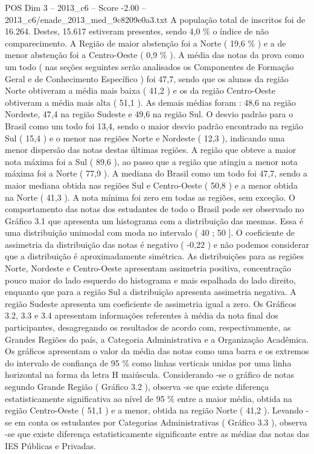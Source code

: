 \begin{textsample}{POS Dim 3 – 2013\_c6 – Score -2.00 – 2013\_c6/enade\_2013\_med\_9c8209e0a3.txt}
A população total de inscritos foi de 16.264.
Destes, 15.617 estiveram presentes, sendo 4,0 \% o índice de não comparecimento.
A Região de maior abstenção foi a Norte ( 19,6 \% ) e a de menor abstenção foi a Centro-Oeste ( 0,9 \% ).
A média das notas da prova como um todo ( nas seções seguintes serão analisados os Componentes de Formação Geral e de Conhecimento Específico ) foi 47,7, sendo que os alunos da região Norte obtiveram a média mais baixa ( 41,2 ) e os da região Centro-Oeste obtiveram a média mais alta ( 51,1 ).
As demais médias foram : 48,6 na região Nordeste, 47,4 na região Sudeste e 49,6 na região Sul.
O desvio padrão para o Brasil como um todo foi 13,4, sendo o maior desvio padrão encontrado na região Sul ( 15,4 ) e o menor nas regiões Norte e Nordeste ( 12,3 ), indicando uma menor dispersão das notas destas últimas regiões.
A região que obteve a maior nota máxima foi a Sul ( 89,6 ), ao passo que a região que atingiu a menor nota máxima foi a Norte ( 77,9 ).
A mediana do Brasil como um todo foi 47,7, sendo a maior mediana obtida nas regiões Sul e Centro-Oeste ( 50,8 ) e a menor obtida na Norte ( 41,3 ).
A nota mínima foi zero em todas as regiões, sem exceção.
O comportamento das notas dos estudantes de todo o Brasil pode ser observado no Gráfico 3.1 que apresenta um histograma com a distribuição das mesmas.
Essa é uma distribuição unimodal com moda no intervalo ( 40 ; 50 ].
O coeficiente de assimetria da distribuição das notas é negativo ( -0,22 ) e não podemos considerar que a distribuição é aproximadamente simétrica.
As distribuições para as regiões Norte, Nordeste e Centro-Oeste apresentam assimetria positiva, concentração pouco maior do lado esquerdo do histograma e mais espalhada do lado direito, enquanto que para a região Sul a distribuição apresenta assimetria negativa.
A região Sudeste apresenta um coeficiente de assimetria igual a zero.
Os Gráficos 3.2, 3.3 e 3.4 apresentam informações referentes à média da nota final dos participantes, desagregando os resultados de acordo com, respectivamente, as Grandes Regiões do país, a Categoria Administrativa e a Organização Acadêmica.
Os gráficos apresentam o valor da média das notas como uma barra e os extremos do intervalo de confiança de 95 \% como linhas verticais unidas por uma linha horizontal na forma da letra H maiúscula.
Considerando -se o gráfico de notas segundo Grande Região ( Gráfico 3.2 ), observa -se que existe diferença estatisticamente significativa ao nível de 95 \% entre a maior média, obtida na região Centro-Oeste ( 51,1 ) e a menor, obtida na região Norte ( 41,2 ).
Levando -se em conta os estudantes por Categorias Administrativas ( Gráfico 3.3 ), observa -se que existe diferença estatisticamente significante entre as médias das notas das IES Públicas e Privadas.

\end{textsample}
